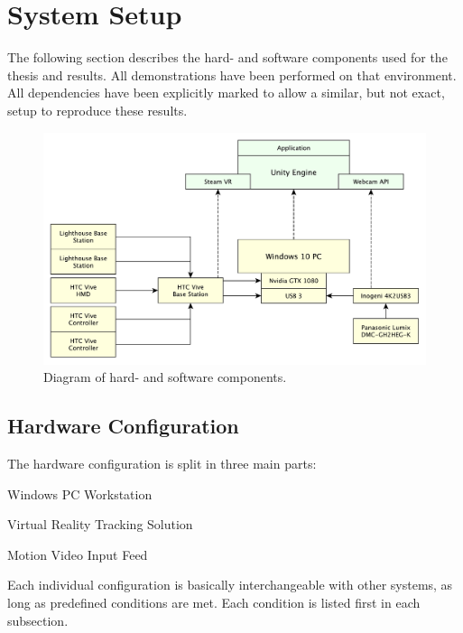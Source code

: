 %
\chapter{System Setup}
\label{ch:system-setup}

The following section describes the hard- and software components used for the 
thesis and results. All demonstrations have been performed on that environment. 
All dependencies have been explicitly marked to allow a similar, but not exact, 
setup to reproduce these results.

\begin{figure}[htb]
	\includegraphics[width=\textwidth]{gfx/System-Components}
	\caption{Diagram of hard- and software components.}
	\label{fig:system-components}
\end{figure}

\section{Hardware Configuration}
\label{sec:hardware-config}

The hardware configuration is split in three main parts:
\begin{my_list}
	\item Windows PC Workstation
	\item Virtual Reality Tracking Solution
	\item Motion Video Input Feed
\end{my_list}

Each individual configuration is basically interchangeable with other systems, 
as long as predefined conditions are met. Each condition is listed first in 
each subsection.

